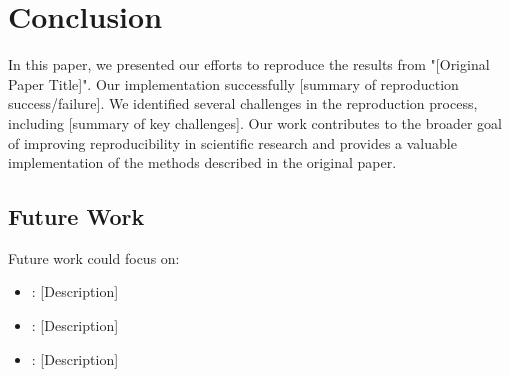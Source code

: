 \documentclass[10pt,twocolumn,letterpaper]{article}
\begin{document}
\section{Conclusion}
\label{sec:conclusion}
In this paper, we presented our efforts to reproduce the results from "[Original Paper Title]". Our implementation successfully [summary of reproduction success/failure]. We identified several challenges in the reproduction process, including [summary of key challenges]. Our work contributes to the broader goal of improving reproducibility in scientific research and provides a valuable implementation of the methods described in the original paper.

\subsection{Future Work}
Future work could focus on:

\begin{itemize}
    \item [Direction 1]: [Description]
    \item [Direction 2]: [Description]
    \item [Direction 3]: [Description]
\end{itemize}

{\small


}
\end{document}
